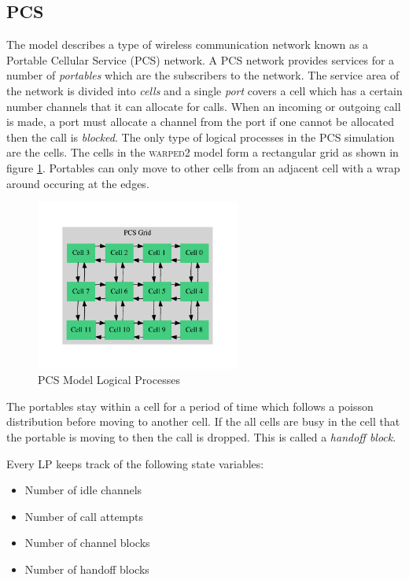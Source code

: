 \documentclass[11pt]{book}
\begin{document}
\subsection{PCS}

The model describes a type of wireless communication network known as a Portable Cellular
Service (PCS) network. A PCS network provides services for a number of \emph{portables} which
are the subscribers to the network. The service area of the network is divided into
\emph{cells} and a single \emph{port} covers a cell which has a certain number channels that
it can allocate for calls. When an incoming or outgoing call is made, a port must allocate
a channel from the port if one cannot be allocated then the call is \emph{blocked}\cite{lin-96b}.
The only type of logical processes in the PCS simulation are the cells. The cells in the
\textsc{warped2} model form a rectangular grid as shown in figure \ref{pcs_model_lps}.
Portables can only move to other cells from an adjacent cell with a wrap around occuring
at the edges.

\begin{figure}[H]
    \centering
    \includegraphics[width=0.6\textwidth]{figs/graphviz/pcs_model.pdf}
    \caption{PCS Model Logical Processes}\label{pcs_model_lps}
\end{figure}

The portables stay within a cell for a period of time which follows a poisson distribution
before moving to another cell. If the all cells are busy in the cell that the portable
is moving to then the call is dropped. This is called a \emph{handoff block}.

Every LP keeps track of the following state variables:
\begin{itemize}
    \item Number of idle channels
    \item Number of call attempts
    \item Number of channel blocks
    \item Number of handoff blocks
\end{itemize}
\end{document}
